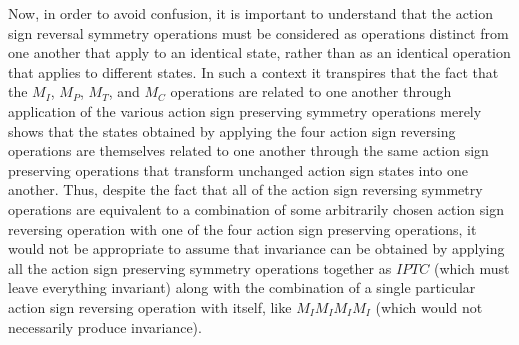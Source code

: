 \documentclass[notitlepage,12pt]{report}
\begin{document}
Now, in order to avoid confusion, it is important to understand that the action sign reversal symmetry operations must be considered as operations distinct from one another that apply to an identical state, rather than as an identical operation that applies to different states. In such a context it transpires that the fact that the $M_I$, $M_P$, $M_T$, and $M_C$ operations are related to one another through application of the various action sign preserving symmetry operations merely shows that the states obtained by applying the four action sign reversing operations are themselves related to one another through the same action sign preserving operations that transform unchanged action sign states into one another. Thus, despite the fact that all of the action sign reversing symmetry operations are equivalent to a combination of some arbitrarily chosen action sign reversing operation with one of the four action sign preserving operations, it would not be appropriate to assume that invariance can be obtained by applying all the action sign preserving symmetry operations together as $IPTC$ (which must leave everything invariant) along with the combination of a single particular action sign reversing operation with itself, like $M_{I}M_{I}M_{I}M_{I}$ (which would not necessarily produce invariance).
\end{document}

